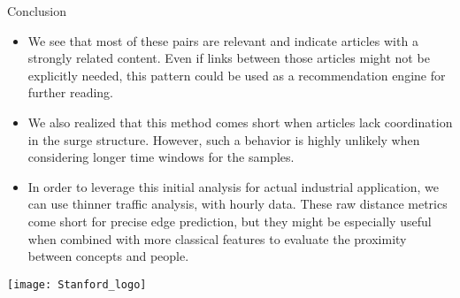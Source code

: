 \documentclass[final]{beamer}
\newlength{\onecolwid}
\begin{document}
\begin{frame}[t]
\begin{columns}[t]
\begin{column}{\onecolwid}


\begin{block}{Conclusion}
\begin{itemize}
  \item We see that most of these pairs are relevant and indicate articles with a strongly related content. Even if links between those articles might not be explicitly needed, this pattern could be used as a recommendation engine for further reading.

  \item We also realized that this method comes short when articles lack coordination in the surge structure. However, such a behavior is highly unlikely when considering longer time windows for the samples.

  \item In order to leverage this initial analysis for actual industrial application, we can use thinner traffic analysis, with hourly data. These raw distance metrics come short for precise edge prediction, but they might be especially useful when combined with more classical features to evaluate the proximity between concepts and people.
\end{itemize}


\begin{center}
    \texttt{[image: Stanford\_logo]}
\end{center}
\end{block}







\end{column}
\end{columns}
\end{frame}
\end{document}
